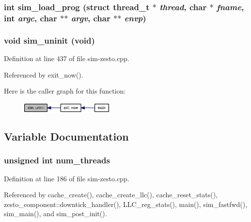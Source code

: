 \subsubsection[{sim\_\-load\_\-prog}]{\setlength{\rightskip}{0pt plus 5cm}int sim\_\-load\_\-prog (struct {\bf thread\_\-t} $\ast$ {\em thread}, \/  char $\ast$ {\em fname}, \/  int {\em argc}, \/  char $\ast$$\ast$ {\em argv}, \/  char $\ast$$\ast$ {\em envp})}\label{thread_8h_524226e93ca6adccd26acb04ba5f00e8}


\subsubsection[{sim\_\-uninit}]{\setlength{\rightskip}{0pt plus 5cm}void sim\_\-uninit (void)}\label{thread_8h_12f418d794abd0896d834c9582373b00}




Definition at line 437 of file sim-zesto.cpp.

Referenced by exit\_\-now().

Here is the caller graph for this function:\nopagebreak
\begin{figure}[H]
\begin{center}
\leavevmode
\includegraphics[width=134pt]{thread_8h_12f418d794abd0896d834c9582373b00_icgraph}
\end{center}
\end{figure}


\subsection{Variable Documentation}
\subsubsection[{num\_\-threads}]{\setlength{\rightskip}{0pt plus 5cm}unsigned int {\bf num\_\-threads}}\label{thread_8h_26a8352e9cd3bc9a6a35bc8d88152985}




Definition at line 186 of file sim-zesto.cpp.

Referenced by cache\_\-create(), cache\_\-create\_\-llc(), cache\_\-reset\_\-stats(), zesto\_\-component::downtick\_\-handler(), LLC\_\-reg\_\-stats(), main(), sim\_\-fastfwd(), sim\_\-main(), and sim\_\-post\_\-init().
